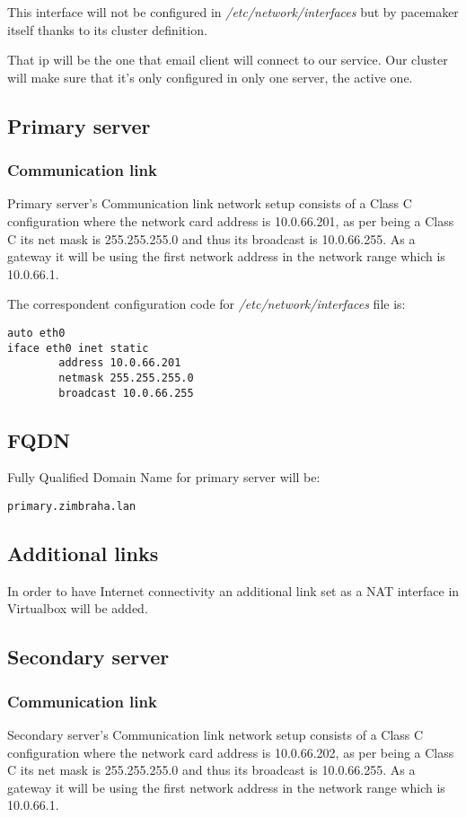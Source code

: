 This interface will not be configured in \textit{/etc/network/interfaces} but by pacemaker itself thanks to its cluster definition.

That ip will be the one that email client will connect to our service. Our cluster will make sure that it's only configured in only one server, the active one.

\subsection {Primary server}

\subsubsection {Communication link}
Primary server's Communication link network setup consists of a Class C configuration where the network card address is 10.0.66.201, as per being a Class C its net mask is 255.255.255.0 and thus its broadcast is 10.0.66.255. As a gateway it will be using the first network address in the network range which is 10.0.66.1.


The correspondent configuration code for \textit{/etc/network/interfaces} file is:
\begin{verbatim}
auto eth0
iface eth0 inet static
        address 10.0.66.201
        netmask 255.255.255.0
        broadcast 10.0.66.255
\end{verbatim}
\subsection {FQDN}
Fully Qualified Domain Name for primary server will be:
\begin{verbatim}
primary.zimbraha.lan
\end{verbatim}
\subsection {Additional links}
In order to have Internet connectivity an additional link set as a NAT interface in Virtualbox will be added.

\subsection {Secondary server}

\subsubsection {Communication link}
Secondary server's Communication link network setup consists of a Class C configuration where the network card address is 10.0.66.202, as per being a Class C its net mask is 255.255.255.0 and thus its broadcast is 10.0.66.255. As a gateway it will be using the first network address in the network range which is 10.0.66.1.

